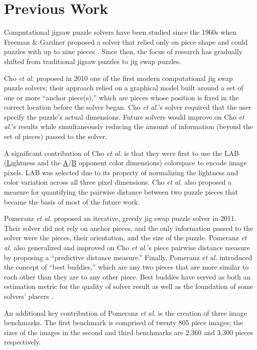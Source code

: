 \chapter{Previous Work}\label{chap:previous_work}

Computational jigsaw puzzle solvers have been studied since the 1960s when Freeman \& Gardner proposed a solver that relied only on piece shape and could puzzles with up to nine pieces \cite{freeman1964}.  Since then, the focus of research has gradually shifted from traditional jigsaw puzzles to jig swap puzzles.  

Cho \textit{et al.} \cite{cho2010} proposed in 2010 one of the first modern computational jig swap puzzle solvers; their approach relied on a graphical model built around a set of one or more ``anchor piece(s),'' which are pieces whose position is fixed in the correct location before the solver began.  Cho \textit{et al.}'s solver required that the user specify the puzzle's actual dimensions.  Future solvers would improve on Cho \textit{et al.}'s results while simultaneously reducing the amount of information (beyond the set of pieces) passed to the solver.

A significant contribution of Cho \textit{et al.} is that they were first to use the LAB  (\underline{L}ightness and the \underline{A}/\underline{B} opponent color dimensions) colorspace to encode image pixels.  LAB was selected due to its property of normalizing the lightness and color variation across all three pixel dimensions.  Cho \textit{et al.} also proposed a measure for quantifying the pairwise distance between two puzzle pieces that became the basis of most of the future work.  

Pomeranz \textit{et al.} \cite{pomeranz2011} proposed an iterative, greedy jig swap puzzle solver in 2011.  Their solver did not rely on anchor pieces, and the only information passed to the solver were the pieces, their orientation, and the size of the puzzle.  Pomeranz \textit{et al.} also generalized and improved on Cho \textit{et al.}'s piece pairwise distance measure by proposing a ``predictive distance measure.''  Finally, Pomeranz \textit{et al.} introduced the concept of ``best buddies,'' which are any two pieces that are more similar to each other than they are to any other piece.  Best buddies have served as both an estimation metric for the quality of solver result as well as the foundation of some solvers' placers \cite{paikin2015}.

An additional key contribution of Pomeranz \textit{et al.} is the creation of three image benchmarks.  The first benchmark is comprised of twenty 805 piece images; the sizes of the images in the second and third benchmarks are 2,360 and 3,300 pieces respectively.

